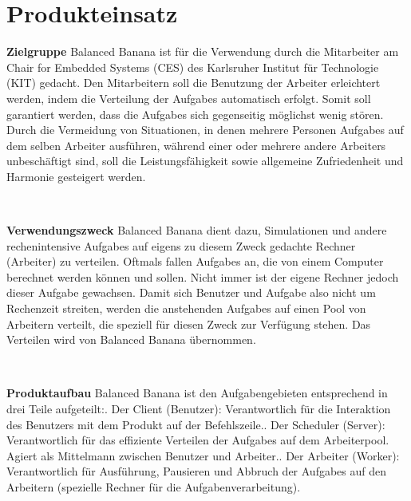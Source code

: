 \documentclass[a4paper,12pt]{article}
\begin{document}
\section{Produkteinsatz}
\begin{itemize}
\begin{minipage}[t]{\linewidth}
\item \textbf{Zielgruppe}\newline
Balanced Banana ist für die Verwendung durch die Mitarbeiter am Chair for Embedded Systems (CES) des Karlsruher Institut für Technologie (KIT) gedacht.\newline
Den Mitarbeitern soll die Benutzung der \gls{Arbeiter} erleichtert werden, indem die Verteilung der \glspl{Aufgabe} automatisch erfolgt. Somit soll garantiert werden, dass die \glspl{Aufgabe} sich gegenseitig möglichst wenig stören.\newline
Durch die Vermeidung von Situationen, in denen mehrere Personen \glspl{Aufgabe} auf dem selben \gls{Arbeiter} ausführen, während einer oder mehrere andere \glspl{Arbeiter} unbeschäftigt sind, soll die Leistungsfähigkeit sowie allgemeine Zufriedenheit und Harmonie gesteigert werden.
\end{minipage}
\\

\begin{minipage}[t]{\linewidth}
\item \textbf{Verwendungszweck}\newline
Balanced Banana dient dazu, Simulationen und andere rechenintensive \glspl{Aufgabe} auf eigens zu diesem Zweck gedachte Rechner (\gls{Arbeiter}) zu verteilen.\newline
Oftmals fallen \glspl{Aufgabe} an, die von einem Computer berechnet werden können und sollen. Nicht immer ist der eigene Rechner jedoch dieser \gls{Aufgabe} gewachsen. Damit sich \gls{Benutzer} und \gls{Aufgabe} also nicht um Rechenzeit streiten, werden die anstehenden \glspl{Aufgabe} auf einen Pool von Arbeitern verteilt, die speziell für diesen Zweck zur Verfügung stehen. Das Verteilen wird von Balanced Banana übernommen.
\end{minipage}
\\

\begin{minipage}[t]{\linewidth}
\item \textbf{Produktaufbau}\newline
Balanced Banana ist den Aufgabengebieten entsprechend in drei Teile aufgeteilt:. Der \gls{Client} (\gls{Benutzer}): Verantwortlich für die Interaktion des Benutzers mit dem Produkt auf der \gls{Befehlszeile}.. Der \gls{Scheduler} (\gls{Server}): Verantwortlich für das effiziente Verteilen der \glspl{Aufgabe} auf dem Arbeiterpool. Agiert als Mittelmann zwischen \gls{Benutzer} und \gls{Arbeiter}.. Der \gls{Arbeiter} (Worker): Verantwortlich für Ausführung, Pausieren und Abbruch der \glspl{Aufgabe} auf den Arbeitern (spezielle Rechner für die Aufgabenverarbeitung).
\end{minipage}
\end{itemize}
\newpage
\end{document}
